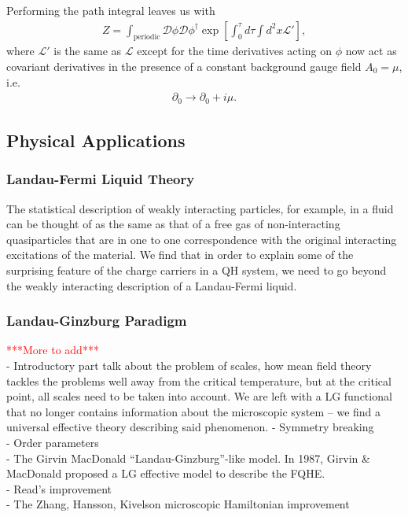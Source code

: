         Performing the path integral leaves us with
        \begin{align}
            Z= \int_{\text{periodic}} \mathcal{D}\phi \mathcal{D}\phi^{\dag} \exp \left[\int_0^{\tau} d\tau \int d^2x \mathcal{L'} \right],
        \end{align}
        where $\mathcal{L'}$ is the same as $\mathcal{L}$ except for the time derivatives acting on $\phi$ now act as covariant derivatives in the presence of a constant background gauge field $A_0=\mu$, i.e.
        \begin{align}
            \partial_0 \rightarrow \partial_0 +i \mu.
        \end{align}



        \subsection{Physical Applications}\label{phys_app_sec}
        \subsubsection{Landau-Fermi Liquid Theory} \label{Fermi_Liquid_sec}
        The statistical description of weakly interacting particles, for example, in a fluid can be thought of as the same as that of a free gas of non-interacting quasiparticles that are in one to one correspondence with the original interacting excitations of the material. We find that in order to explain some of the surprising feature of the charge carriers in a QH system, we need to go beyond the weakly interacting description of a Landau-Fermi liquid.
        \subsubsection{Landau-Ginzburg Paradigm} \label{Landau-Ginzburg_sec}
        \textcolor{red}{***More to add***} \\
        - Introductory part talk about the problem of scales, how mean field theory tackles the problems well away from the critical temperature, but at the critical point, all scales need to be taken into account. We are left with a LG functional that no longer contains information about the microscopic system -- we find a universal effective theory describing said phenomenon.
        - Symmetry breaking \\
        - Order parameters\\
        - The Girvin MacDonald ``Landau-Ginzburg''-like model. \cite{Girvin1987} In 1987, Girvin \& MacDonald proposed a LG effective model to describe the FQHE. \\
        - Read's improvement \cite{Read1989}\\
        - The Zhang, Hansson, Kivelson microscopic Hamiltonian improvement \cite{PhysRevLett.62.82}

